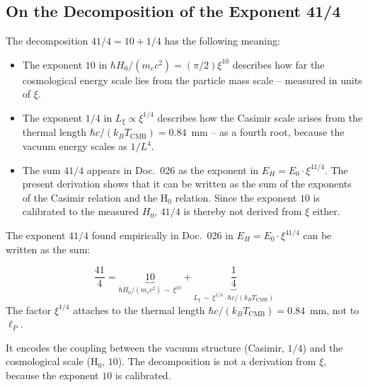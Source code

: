 \subsection{On the Decomposition of the Exponent 41/4}

The decomposition $41/4 = 10 + 1/4$ has the following meaning:

\begin{itemize}
    \item The exponent $10$ in $\hbar H_0/(m_e c^2) = (\pi/2)\xi^{10}$
    describes how far the cosmological energy scale lies from the
    particle mass scale -- measured in units of $\xi$.

    \item The exponent $1/4$ in $L_\xi \propto \xi^{1/4}$ describes
    how the Casimir scale arises from the thermal length
    $\hbar c/(k_BT_\text{CMB}) = 0.84$~mm -- as a
    fourth root, because the vacuum energy scales as $1/L^4$.

    \item The sum $41/4$ appears in Doc.~026 as the exponent in
    $E_H = E_0 \cdot \xi^{41/4}$. The present derivation shows that it
    can be written as the sum of the exponents of the Casimir relation
    and the H$_0$ relation. Since the exponent $10$ is calibrated to the
    measured $H_0$, $41/4$ is thereby not derived from $\xi$ either.
\end{itemize}

\begin{keyresult}
    The exponent $41/4$ found empirically in Doc.~026 in
    $E_H = E_0 \cdot \xi^{41/4}$ can be written as the sum:

    \begin{equation}
        \frac{41}{4}
        = \underbrace{10}_{\hbar H_0/(m_e c^2) \,\sim\, \xi^{10}}
        + \underbrace{\frac{1}{4}}_{L_\xi \,\sim\, \xi^{1/4} \cdot \hbar c/(k_B T_\text{CMB})}
        \label{eq:41_4_explained}
    \end{equation}
    The factor $\xi^{1/4}$ attaches to the thermal length
    $\hbar c/(k_BT_\text{CMB}) = 0.84$~mm, not to $\ell_P$.

    It encodes the coupling between the vacuum structure (Casimir, $1/4$)
    and the cosmological scale (H$_0$, $10$). The decomposition is not a
    derivation from $\xi$, because the exponent $10$ is calibrated.
\end{keyresult}


